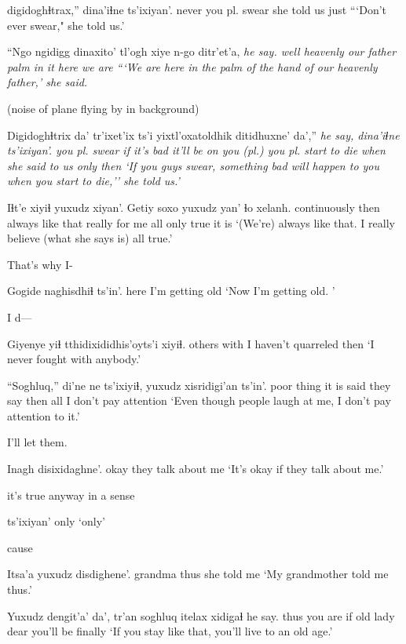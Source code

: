 \documentclass[12pt]{article}
\begin{document}
 digidoghɬtrax,'' dina'iɬne   ts'ixiyan'.
never         {you pl. swear} {she told us} just
\glt ```Don't ever swear," she told us.'
\glend

\gll ``Ngo  ngidigg dinaxito'   tl'ogh xiye  n-go   ditr'et'a, \em{he say}.
well heavenly {our father} palm  {in it} here {we are}
\glt ```We are here in the palm of the hand of our heavenly father,' she said.
\glend

(noise of plane flying by in background)

\gll Digidoghɬtrix da' tr'ixet'ix ts'i yixtl'oxatoldhik ditidhuxne' da','' \em{he say}, dina'iɬne ts'ixiyan'.
{you pl. swear} if {it's bad}  {}  {it'll be on you (pl.)} {you pl. start to die} when {} {she said to us} {only then}
\glt `If you guys swear, something bad will happen to you when you start to die,'' she told us.'
\glend

\gll Iɬt'e xiyiɬ  {yuxudz xiyan'.} Getiy  soxo   yuxudz yan' ɬo   xelanh.
continuously  then {always like that}    really {for me} all  only true {it is}
\glt `(We're) always like that. I really believe (what she says is) all true.'
\glend

That's why I-

\gll Gogide naghisdhiɬ ts'in'.
here   {I'm getting old}
\glt `Now I'm getting old. '
\glend

I d---
 
\gll Giyenye       yiɬ  {tthidixididhis'oyts'i} xiyiɬ.
{others} with {I haven't quarreled}    then
\glt `I never fought with anybody.'
\glend

\gll ``Soghluq,''    di'ne      ne ts'ixiyiɬ,      yuxudz {xisridigi'an ts'in'}.
{poor thing} {it is said} {they say} then all    {I don't pay attention}
\glt `Even though people laugh at me, I don't pay attention to it.'
\glend

I'll let them.

\gll Inagh  disixidaghne'.      
okay   {they talk about me}
\glt `It's okay if they talk about me.'
\glend

it's true anyway in a sense 

\gll ts'ixiyan' 
only
\glt `only'
\glend

cause 

\gll Itsa'a  yuxudz disdighene'.
grandma thus   {she told me}
\glt `My grandmother told me thus.'
\glend

\gll Yuxudz dengit'a' da', tr'an     soghluq itelax  xidigaɬ {he say}.
thus   {you are} if  {old lady} dear {you'll be} finally     
\glt `If you stay like that, you'll live to an old age.'
\glend
\end{document}
